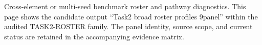 Cross-element or multi-seed benchmark roster and pathway diagnostics. This page shows the candidate output ``Task2 broad roster profiles 9panel'' within the audited TASK2-ROSTER family. The panel identity, source scope, and current status are retained in the accompanying evidence matrix.
